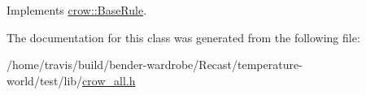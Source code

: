 Implements \hyperlink{classcrow_1_1_base_rule_a895d85332340788206cee0b1555ac8c2}{crow\-::\-Base\-Rule}.



The documentation for this class was generated from the following file\-:\begin{DoxyCompactItemize}
\item 
/home/travis/build/bender-\/wardrobe/\-Recast/temperature-\/world/test/lib/\hyperlink{crow__all_8h}{crow\-\_\-all.\-h}\end{DoxyCompactItemize}
